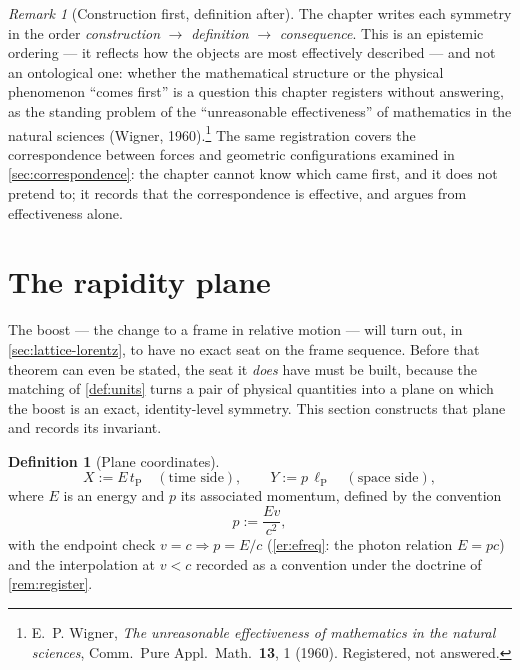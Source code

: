 \documentclass[11pt]{amsbook}
\theoremstyle{plain}
\theoremstyle{definition}
\newtheorem{definition}[theorem]{Definition}
\theoremstyle{remark}
\newtheorem{remark}[theorem]{Remark}
\begin{document}
\begin{remark}[Construction first, definition after]\label{rem:wigner}
The chapter writes each symmetry in the order \emph{construction} $\to$ \emph{definition} $\to$ \emph{consequence}. This is an epistemic ordering --- it reflects how the objects are most effectively described --- and not an ontological one: whether the mathematical structure or the physical phenomenon ``comes first'' is a question this chapter registers without answering, as the standing problem of the ``unreasonable effectiveness'' of mathematics in the natural sciences (Wigner, 1960).\footnote{E.~P. Wigner, \emph{The unreasonable effectiveness of mathematics in the natural sciences}, Comm.\ Pure Appl.\ Math.\ \textbf{13}, 1 (1960). Registered, not answered.} The same registration covers the correspondence between forces and geometric configurations examined in \cref{sec:correspondence}: the chapter cannot know which came first, and it does not pretend to; it records that the correspondence is effective, and argues from effectiveness alone.
\end{remark}

\section{The rapidity plane}\label{sec:rapidity-plane}

The boost --- the change to a frame in relative motion --- will turn out, in \cref{sec:lattice-lorentz}, to have no exact seat on the frame sequence. Before that theorem can even be stated, the seat it \emph{does} have must be built, because the matching of \cref{def:units} turns a pair of physical quantities into a plane on which the boost is an exact, identity-level symmetry. This section constructs that plane and records its invariant.

\begin{definition}[Plane coordinates]\label{def:plane}
\begin{equation}\label{eq:plane}
X := E\,t_{\mathrm P} \quad (\text{time side}), \qquad Y := p\,\ell_{\mathrm P} \quad (\text{space side}),
\end{equation}
where $E$ is an energy and $p$ its associated momentum, defined by the convention
\begin{equation}\label{eq:momentum}
p := \frac{E v}{c^{2}},
\end{equation}
with the endpoint check $v = c \Rightarrow p = E/c$ (\cref{er:efreq}: the photon relation $E = pc$) and the interpolation at $v < c$ recorded as a convention under the doctrine of \cref{rem:register}.
\end{definition}
\end{document}
